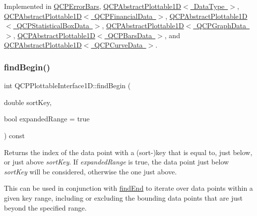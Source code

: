 Implemented in \mbox{\hyperlink{class_q_c_p_error_bars_a09b99cf293b6041ae8d5c52cf8dd599c}{Q\+C\+P\+Error\+Bars}}, \mbox{\hyperlink{class_q_c_p_abstract_plottable1_d_ac6201b01aee550ef0a240183781d1f9a}{Q\+C\+P\+Abstract\+Plottable1\+D$<$ Data\+Type $>$}}, \mbox{\hyperlink{class_q_c_p_abstract_plottable1_d_ac6201b01aee550ef0a240183781d1f9a}{Q\+C\+P\+Abstract\+Plottable1\+D$<$ Q\+C\+P\+Financial\+Data $>$}}, \mbox{\hyperlink{class_q_c_p_abstract_plottable1_d_ac6201b01aee550ef0a240183781d1f9a}{Q\+C\+P\+Abstract\+Plottable1\+D$<$ Q\+C\+P\+Statistical\+Box\+Data $>$}}, \mbox{\hyperlink{class_q_c_p_abstract_plottable1_d_ac6201b01aee550ef0a240183781d1f9a}{Q\+C\+P\+Abstract\+Plottable1\+D$<$ Q\+C\+P\+Graph\+Data $>$}}, \mbox{\hyperlink{class_q_c_p_abstract_plottable1_d_ac6201b01aee550ef0a240183781d1f9a}{Q\+C\+P\+Abstract\+Plottable1\+D$<$ Q\+C\+P\+Bars\+Data $>$}}, and \mbox{\hyperlink{class_q_c_p_abstract_plottable1_d_ac6201b01aee550ef0a240183781d1f9a}{Q\+C\+P\+Abstract\+Plottable1\+D$<$ Q\+C\+P\+Curve\+Data $>$}}.

\mbox{\label{class_q_c_p_plottable_interface1_d_a5b95783271306a4de97be54eac1e7d13}} 
\subsubsection{\texorpdfstring{find\+Begin()}{findBegin()}}
{\footnotesize\ttfamily int Q\+C\+P\+Plottable\+Interface1\+D\+::find\+Begin (\begin{DoxyParamCaption}\item[{double}]{sort\+Key,  }\item[{bool}]{expanded\+Range = {\ttfamily true} }\end{DoxyParamCaption}) const\hspace{0.3cm}{\ttfamily [pure virtual]}}

Returns the index of the data point with a (sort-\/)key that is equal to, just below, or just above {\itshape sort\+Key}. If {\itshape expanded\+Range} is true, the data point just below {\itshape sort\+Key} will be considered, otherwise the one just above.

This can be used in conjunction with \mbox{\hyperlink{class_q_c_p_plottable_interface1_d_a5deced1016bc55a41a2339619045b295}{find\+End}} to iterate over data points within a given key range, including or excluding the bounding data points that are just beyond the specified range.

